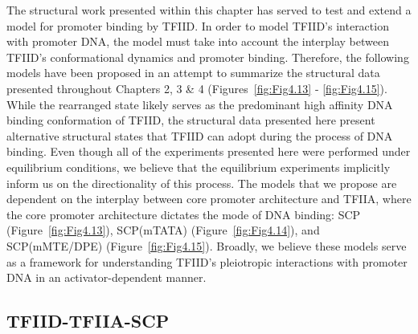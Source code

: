 The structural work presented within this chapter has served to test and extend a model for promoter binding by TFIID. In order to model TFIID's interaction with promoter DNA, the model must take into account the interplay between TFIID's conformational dynamics and promoter binding. Therefore, the following models have been proposed in an attempt to summarize the structural data presented throughout Chapters 2, 3 \& 4 (Figures~\ref{fig:Fig4.13} - \ref{fig:Fig4.15}). While the rearranged state likely serves as the predominant high affinity DNA binding conformation of TFIID, the structural data presented here present alternative structural states that TFIID can adopt during the process of DNA binding. Even though all of the experiments presented here were performed under equilibrium conditions, we believe that the equilibrium experiments implicitly inform us on the directionality of this process. The models that we propose are dependent on the interplay between core promoter architecture and TFIIA, where the core promoter architecture dictates the mode of DNA binding: SCP (Figure~\ref{fig:Fig4.13}), SCP(mTATA) (Figure~\ref{fig:Fig4.14}), and SCP(mMTE/DPE) (Figure~\ref{fig:Fig4.15}). Broadly, we believe these models serve as a framework for understanding TFIID's pleiotropic interactions with promoter DNA in an activator-dependent manner.\\

\subsection{TFIID-TFIIA-SCP}

